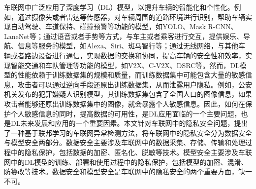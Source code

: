 车联网中广泛应用了深度学习（DL）模型，以提升车辆的智能化和个性化。例如，通过摄像头或者雷达等传感器，对车辆周围的道路环境进行识别，帮助车辆实现自动驾驶、车道保持、碰撞预警等功能的模型，如YOLO、Mask R-CNN、LaneNet等；通过语音或者手势等方式，与车主或者乘客进行交互，提供娱乐、导航、信息等服务的模型，如Alexa、Siri、斑马智行等；通过无线网络，与其他车辆或者路边设备进行通信，实现数据的交换和协同，提高车辆的安全性和效率，实现智能交通和车队管理等功能的模型，如V2X、C-V2X、DSRC等。然而，DL模型的性能依赖于训练数据集的规模和质量，而训练数据集中可能包含大量的敏感信息，攻击者可以通过逆向手段还原出训练数据集，从而泄露用户隐私。例如，公安机关发布的犯罪嫌疑人识别模型，其训练数据集包含了全国人口的图像信息，如果攻击者能够还原出训练数据集中的图像，就会暴露个人敏感信息。因此，如何在保护个人敏感信息的同时，提高数据的可用性，是DL应用面临的一个主要问题，也是DL未来发展和应用的一个重要因素。本文针对车联网中的隐私安全问题，提出了一种基于联邦学习的车联网异常检测方法，将车联网中的隐私安全分为数据安全与模型安全两部分。数据安全主要涉及车联网中的数据采集、存储、传输和处理过程中的隐私保护，包括数据的加密、匿名化、脱敏等技术。模型安全主要涉及车联网中的DL模型的训练、部署和使用过程中的隐私保护，包括模型的加密、混淆、防篡改等技术。数据安全和模型安全是车联网中的隐私安全的两个重要方面，缺一不可。



